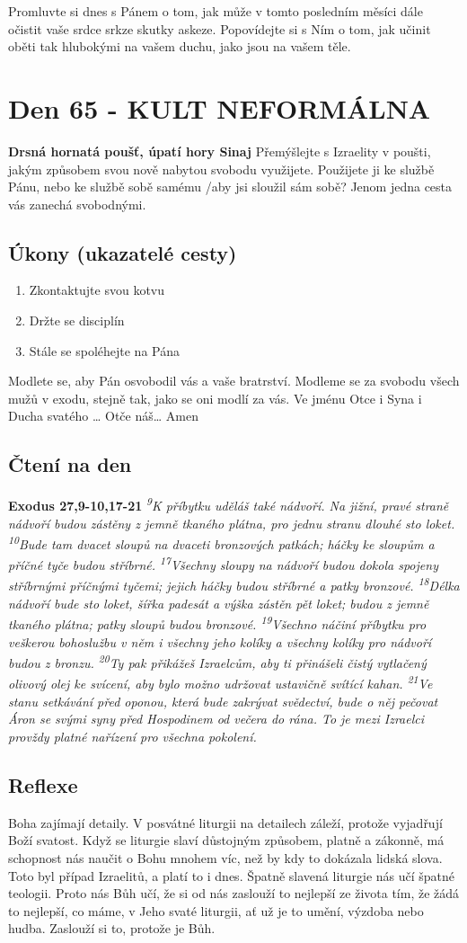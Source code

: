 \documentclass[11pt]{article}
\newcommand{\zacatekDesatyTyden}{
\textbf{Drsná hornatá poušť, úpatí hory Sinaj} \newline 
Přemýšlejte s Izraelity v poušti, jakým způsobem svou nově nabytou svobodu využijete. Použijete ji ke službě Pánu, nebo ke službě sobě samému /aby jsi sloužil sám sobě? Jenom jedna cesta vás zanechá svobodnými.

\subsection*{Úkony (ukazatelé cesty)}
\begin{enumerate}
  \item Zkontaktujte svou kotvu
  \item Držte se disciplín
  \item Stále se spoléhejte na Pána
\end{enumerate}
Modlete se, aby Pán osvobodil vás a vaše bratrství. \newline
Modleme se za svobodu všech mužů v exodu, stejně tak, jako se oni modlí za vás.\newline
Ve jménu Otce i Syna i Ducha svatého …  Otče náš… Amen
}
\begin{document}
Promluvte si dnes s Pánem o tom, jak může v tomto posledním měsíci dále očistit vaše srdce srkze skutky
askeze. Popovídejte si s Ním o tom, jak učinit oběti tak hlubokými na vašem duchu, jako jsou na vašem těle.





\newpage
\section{Den 65 - KULT NEFORMÁLNA }
\zacatekDesatyTyden
\subsection*{Čtení na den}
\textbf{Exodus 27,9-10,17-21}
\newline
\textit{
\textsuperscript{9}K příbytku uděláš také nádvoří. Na jižní, pravé straně nádvoří budou zástěny z jemně tkaného plátna, pro jednu stranu dlouhé sto loket.
\textsuperscript{10}Bude tam dvacet sloupů na dvaceti bronzových patkách; háčky ke sloupům a příčné tyče budou stříbrné.
\newline
\newline
\textsuperscript{17}Všechny sloupy na nádvoří budou dokola spojeny stříbrnými příčnými tyčemi; jejich háčky budou stříbrné a patky bronzové.
\textsuperscript{18}Délka nádvoří bude sto loket, šířka padesát a výška zástěn pět loket; budou z jemně tkaného plátna; patky sloupů budou bronzové.
\textsuperscript{19}Všechno náčiní příbytku pro veškerou bohoslužbu v něm i všechny jeho kolíky a všechny kolíky pro nádvoří budou z bronzu.
\textsuperscript{20}Ty pak přikážeš Izraelcům, aby ti přinášeli čistý vytlačený olivový olej ke svícení, aby bylo možno udržovat ustavičně svítící kahan.
\textsuperscript{21}Ve stanu setkávání před oponou, která bude zakrývat svědectví, bude o něj pečovat Áron se svými syny před Hospodinem od večera do rána. To je mezi Izraelci provždy platné nařízení pro všechna pokolení.
}

\subsection*{Reflexe}

Boha zajímají detaily. V posvátné liturgii na detailech záleží, protože vyjadřují Boží svatost. Když se liturgie slaví
důstojným způsobem, platně a zákonně, má schopnost nás naučit o Bohu mnohem víc, než by kdy to dokázala lidská
slova. Toto byl případ Izraelitů, a platí to i dnes. Špatně slavená liturgie nás učí špatné teologii. Proto nás Bůh učí, že si
od nás zaslouží to nejlepší ze života tím, že žádá to nejlepší, co máme, v Jeho svaté liturgii, ať už je to umění, výzdoba
nebo hudba. Zaslouží si to, protože je Bůh.
\end{document}
